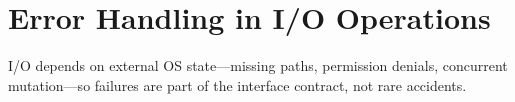 \section{Error Handling in I/O Operations}

I/O depends on external OS state---missing paths, permission denials, concurrent mutation---so failures are part of the interface contract, not rare accidents.
